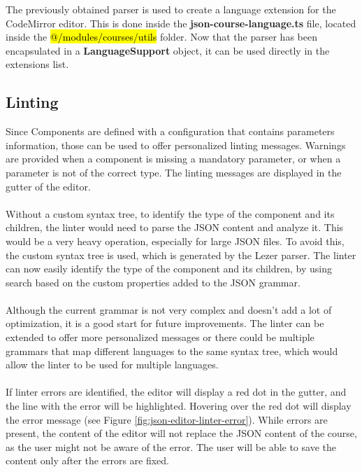 \noindent The previously obtained parser is used to create a language extension for the CodeMirror editor. This is done inside the \textbf{json-course-language.ts} file, located inside the \hl{@/modules/courses/utils} folder. Now that the parser has been encapsulated in a \textbf{LanguageSupport} object, it can be used directly in the extensions list.

\subsection{Linting}

\noindent Since Components are defined with a configuration that contains parameters information, those can be used to offer personalized linting messages. Warnings are provided when a component is missing a mandatory parameter, or when a parameter is not of the correct type. The linting messages are displayed in the gutter of the editor. 
\\\\
\noindent Without a custom syntax tree, to identify the type of the component and its children, the linter would need to parse the JSON content and analyze it. This would be a very heavy operation, especially for large JSON files. To avoid this, the custom syntax tree is used, which is generated by the Lezer parser. The linter can now easily identify the type of the component and its children, by using search based on the custom properties added to the JSON grammar.
\\\\
Although the current grammar is not very complex and doesn't add a lot of optimization, it is a good start for future improvements. The linter can be extended to offer more personalized messages or there could be multiple grammars that map different languages to the same syntax tree, which would allow the linter to be used for multiple languages.
\\\\
\noindent If linter errors are identified, the editor will display a red dot in the gutter, and the line with the error will be highlighted. Hovering over the red dot will display the error message (see Figure \ref{fig:json-editor-linter-error}). While errors are present, the content of the editor will not replace the JSON content of the course, as the user might not be aware of the error. The user will be able to save the content only after the errors are fixed.

